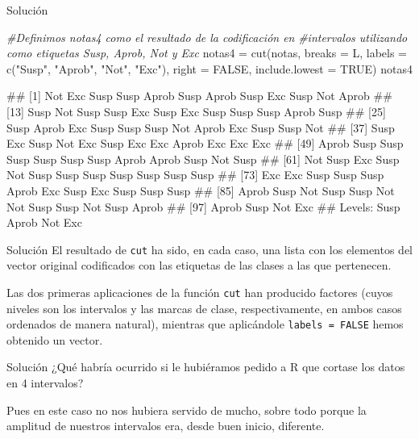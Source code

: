 \documentclass[
  ignorenonframetext,
  aspectratio=169]{beamer}
\newenvironment{Shaded}{\begin{snugshade}}{\end{snugshade}}
\newcommand{\AttributeTok}[1]{\textcolor[rgb]{0.77,0.63,0.00}{#1}}
\newcommand{\CommentTok}[1]{\textcolor[rgb]{0.56,0.35,0.01}{\textit{#1}}}
\newcommand{\ConstantTok}[1]{\textcolor[rgb]{0.00,0.00,0.00}{#1}}
\newcommand{\FunctionTok}[1]{\textcolor[rgb]{0.00,0.00,0.00}{#1}}
\newcommand{\NormalTok}[1]{#1}
\newcommand{\OtherTok}[1]{\textcolor[rgb]{0.56,0.35,0.01}{#1}}
\newcommand{\StringTok}[1]{\textcolor[rgb]{0.31,0.60,0.02}{#1}}
\let\oldverbatim\verbatim
\let\endoldverbatim\endverbatim
\renewenvironment{verbatim}{\tiny\oldverbatim}{\endoldverbatim}
\begin{document}
\begin{frame}[fragile]{Solución}
\protect\hypertarget{soluciuxf3n-20}{}
\begin{Shaded}
\begin{Highlighting}[]
\CommentTok{\#Definimos notas4 como el resultado de la codificación en }
\CommentTok{\#intervalos utilizando como etiquetas Susp, Aprob, Not y Exc}
\NormalTok{notas4 }\OtherTok{=} \FunctionTok{cut}\NormalTok{(notas, }\AttributeTok{breaks =}\NormalTok{ L, }\AttributeTok{labels =} \FunctionTok{c}\NormalTok{(}\StringTok{"Susp"}\NormalTok{, }\StringTok{"Aprob"}\NormalTok{, }\StringTok{"Not"}\NormalTok{, }\StringTok{"Exc"}\NormalTok{), }
             \AttributeTok{right =} \ConstantTok{FALSE}\NormalTok{, }\AttributeTok{include.lowest =} \ConstantTok{TRUE}\NormalTok{)}
\NormalTok{notas4}
\end{Highlighting}
\end{Shaded}

\begin{verbatim}
##   [1] Not   Exc   Susp  Susp  Aprob Susp  Aprob Susp  Exc   Susp  Not   Aprob
##  [13] Susp  Not   Susp  Susp  Exc   Susp  Exc   Susp  Susp  Susp  Aprob Susp 
##  [25] Susp  Aprob Exc   Susp  Susp  Susp  Not   Aprob Exc   Susp  Susp  Not  
##  [37] Susp  Exc   Susp  Not   Exc   Susp  Exc   Exc   Aprob Exc   Exc   Exc  
##  [49] Aprob Susp  Susp  Susp  Susp  Susp  Susp  Aprob Aprob Susp  Not   Susp 
##  [61] Not   Susp  Exc   Susp  Not   Susp  Susp  Susp  Susp  Susp  Susp  Susp 
##  [73] Exc   Exc   Susp  Susp  Susp  Aprob Exc   Susp  Exc   Susp  Susp  Susp 
##  [85] Aprob Susp  Not   Susp  Susp  Not   Not   Susp  Susp  Not   Susp  Aprob
##  [97] Aprob Susp  Not   Exc  
## Levels: Susp Aprob Not Exc
\end{verbatim}
\end{frame}

\begin{frame}[fragile]{Solución}
\protect\hypertarget{soluciuxf3n-21}{}
El resultado de \texttt{cut} ha sido, en cada caso, una lista con los
elementos del vector original codificados con las etiquetas de las
clases a las que pertenecen.

Las dos primeras aplicaciones de la función \texttt{cut} han producido
factores (cuyos niveles son los intervalos y las marcas de clase,
respectivamente, en ambos casos ordenados de manera natural), mientras
que aplicándole \texttt{labels\ =\ FALSE} hemos obtenido un vector.
\end{frame}

\begin{frame}{Solución}
\protect\hypertarget{soluciuxf3n-22}{}
¿Qué habría ocurrido si le hubiéramos pedido a R que cortase los datos
en 4 intervalos?

Pues en este caso no nos hubiera servido de mucho, sobre todo porque la
amplitud de nuestros intervalos era, desde buen inicio, diferente.
\end{frame}
\end{document}
